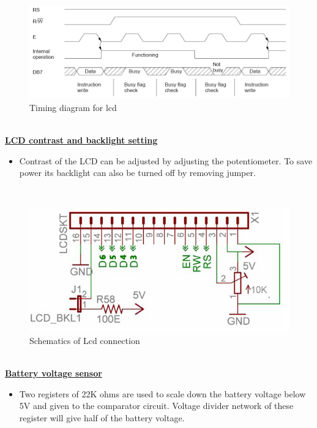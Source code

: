 \documentclass[a4paper,12pt,oneside]{book}
\begin{document}
	\hfill\\
	\begin{figure}[h!]
		\caption{Timing diagram for lcd}
		\includegraphics[width=\textwidth]{./HardwareManual/lcd_timing_diagram.png}
	\end{figure}	
	\hfill\\
	\newpage
	\underline{\textbf{\Large{LCD contrast and backlight setting}}}
	\begin{itemize}
	\item{Contrast of the LCD can be adjusted by adjusting the potentiometer. To save power its backlight can also be turned off by removing jumper.}
	\end{itemize}
	
	\hfill\\
	\begin{figure}[h!]
		\caption{Schematics of Lcd connection}
		\includegraphics[width=\textwidth]{./HardwareManual/lcd_connection.png}
	\end{figure}	
	\hfill\\
	\newpage
	\underline{\textbf{\Large{Battery voltage sensor}}}
	\begin{itemize}
		\item{Two registers of 22K ohms are used to scale down the battery voltage below 5V and given to the
			comparator circuit. Voltage divider network of these register will give half of the
			battery voltage.}
	\end{itemize}
\end{document}
